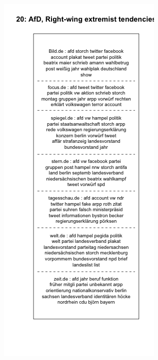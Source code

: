 \documentclass[12pt,a4paper,notitlepage]{article}
\begin{document}
{%
\begin{figure}[H]
	\begin{center}
		\begin{subfigure}[normla]{0.49\textwidth}
			\includegraphics[width=\textwidth]{../figs/plotquote20.png}

\end{subfigure}
\end{center}
\end{figure}}
\end{document}
